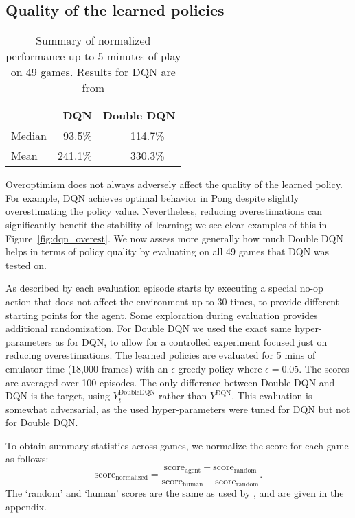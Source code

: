 \documentclass[letterpaper]{article}
\begin{document}
\subsection{Quality of the learned policies}
\label{sec:result:quality}
\begin{table}[t]
\centering
 \def\arraystretch{1.1}
 \begin{tabular}{|l|rr|}
 \hline
  		        &\small DQN & \small Double DQN 		\\ \hline 
 \small Median  &\small ~93.5\% 	& \small 114.7\%~~       \\ \hline 
 \small Mean    &\small 241.1\% 	& \small 330.3\%~~ 	    \\ \hline 
  \end{tabular}
\caption{\small Summary of normalized performance up to 5 minutes of play on 49 games.  Results for DQN are from \citet{Mnih:2015}}
\label{tableresults}
\end{table}

Overoptimism does not always adversely affect the quality of the learned policy.
For example, DQN achieves optimal behavior in Pong despite slightly overestimating the policy value.
Nevertheless, reducing overestimations can significantly benefit the stability of learning; we see clear examples of this in Figure~\ref{fig:dqn_overest}. We now assess more generally how much Double DQN helps in terms of policy quality by evaluating on all 49 games that DQN was tested on.

As described by \citet{Mnih:2015} each evaluation episode starts by executing a special
no-op action that does not affect the environment up to 30 times, to provide different starting points for the agent.
Some exploration
during evaluation provides additional randomization.
For Double DQN we used the exact same hyper-parameters as for DQN, to allow for a controlled experiment focused just on reducing overestimations.  The learned policies are evaluated for 5 mins of emulator time (18,000 frames)
with an $\epsilon$-greedy policy where $\epsilon= 0.05$. The scores are averaged over 100 episodes.
The only difference between Double DQN and DQN is the target, using $Y^{\text{DoubleDQN}}_t$ rather than $Y^{\text{DQN}}$.
This evaluation is somewhat adversarial, as the used hyper-parameters were tuned for DQN but not for Double DQN.

To obtain summary statistics across games, we normalize the score for each game as follows:
\begin{equation}
  \text{score}_{\text{normalized}} = \frac{\text{score}_\text{agent} - \text{score}_\text{random}}{\text{score}_\text{human} - \text{score}_\text{random}}.
\end{equation}
The `random' and `human' scores are the same as used by \citet{Mnih:2015}, and are given in the appendix.
\end{document}
